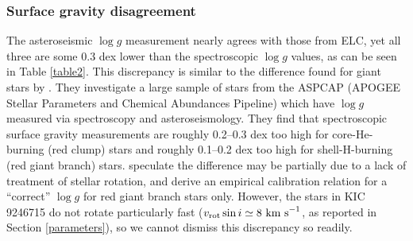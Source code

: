 \subsubsection{Surface gravity disagreement}
The asteroseismic $\log g$ measurement nearly agrees with those from ELC, yet all three are some 0.3 dex lower than the spectroscopic $\log g$ values, as can be seen in Table \ref{table2}. This discrepancy is similar to the difference found for giant stars by \citet{hol15}. They investigate a large sample of stars from the ASPCAP (APOGEE Stellar Parameters and Chemical Abundances Pipeline) which have $\log g$ measured via spectroscopy and asteroseismology. They find that spectroscopic surface gravity measurements are roughly 0.2--0.3 dex too high for core-He-burning (red clump) stars and roughly 0.1--0.2 dex too high for shell-H-burning (red giant branch) stars. \citet{hol15} speculate the difference may be partially due to a lack of treatment of stellar rotation, and derive an empirical calibration relation for a ``correct'' $\log g$ for red giant branch stars only. However, the stars in KIC 9246715 do not rotate particularly fast ($v_{\rm{rot}} \sin i \simeq 8 \ \rm{km \ s}^{-1}$, as reported in Section \ref{parameters}), so we cannot dismiss this discrepancy so readily.
